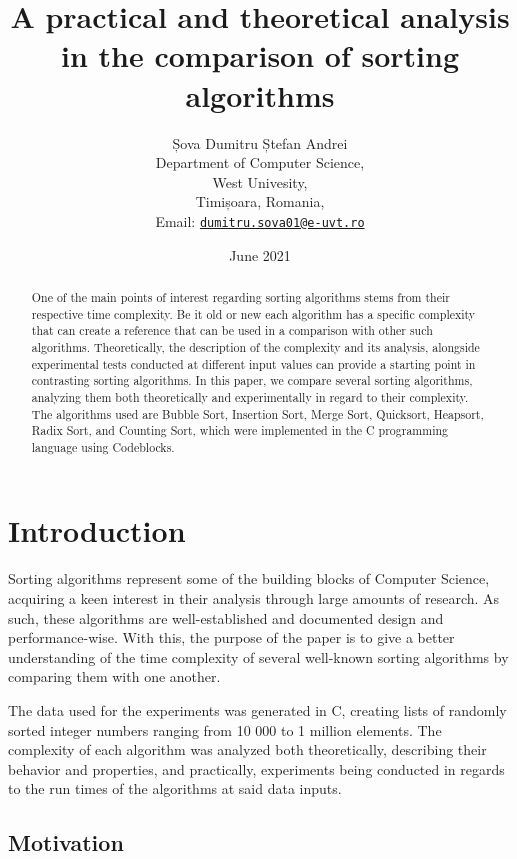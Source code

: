 \documentclass{article}
\title{A practical and theoretical analysis in the comparison of sorting algorithms}
\author{Șova Dumitru Ștefan Andrei\\
Department of Computer Science, \\
West Univesity, \\
Timișoara, Romania, \\
Email: \href{mailto:dumitru.sova01@e-uvt.ro}{\texttt{dumitru.sova01@e-uvt.ro}}
}
\date{June 2021}
\numberwithin{figure}{section}
\begin{document}
\maketitle
\begin{abstract}
One of the main points of interest regarding sorting algorithms stems from their respective time complexity. Be it old or new each algorithm has a specific complexity that can create a reference that can be used in a comparison with other such algorithms. Theoretically, the description of the complexity and its analysis, alongside experimental tests conducted at different input values can provide a starting point in contrasting sorting algorithms. In this paper, we compare several sorting algorithms, analyzing them both theoretically and experimentally in regard to their complexity. The algorithms used are Bubble Sort, Insertion Sort, Merge Sort, Quicksort, Heapsort, Radix Sort, and Counting Sort, which were implemented in the C programming language using Codeblocks.


\end{abstract}
\pagebreak
 

\section{Introduction}

Sorting algorithms represent some of the building blocks of Computer Science, acquiring a keen interest in their analysis through large amounts of research. As such, these algorithms are well-established and documented design and performance-wise. With this, the purpose of the paper is to give a better understanding of the time complexity of several well-known sorting algorithms by comparing them with one another.

The data used for the experiments was generated in C, creating lists of randomly sorted integer numbers ranging from 10 000 to 1 million elements. The complexity of each algorithm was analyzed both theoretically, describing their behavior and properties, and practically, experiments being conducted in regards to the run times of the algorithms at said data inputs.

\subsection{Motivation}
\end{document}
